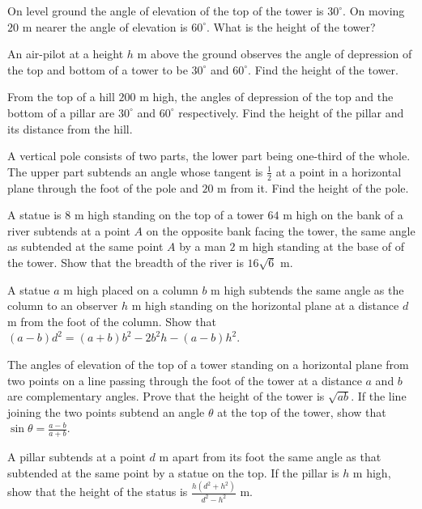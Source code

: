 \item On level ground the angle of elevation of the top of the tower is $30^\circ$. On moving $20$ m nearer the angle of
  elevation is $60^\circ$. What is the height of the tower?

\item An air-pilot at a height $h$ m above the ground observes the angle of depression of the top and bottom of a tower to be
  $30^\circ$ and $60^\circ$. Find the height of the tower.

\item From the top of a hill $200$ m high, the angles of depression of the top and the bottom of a pillar are $30^\circ$
  and $60^\circ$ respectively. Find the height of the pillar and its distance from the hill.

\item A vertical pole consists of two parts, the lower part being one-third of the whole. The upper part subtends an angle whose
  tangent is $\frac{1}{2}$ at a point in a horizontal plane through the foot of the pole and $20$ m from it. Find
  the height of the pole.

\item A statue is $8$ m high standing on the top of a tower $64$ m high on the bank of a river subtends at a point
  $A$ on the opposite bank facing the tower, the same angle as subtended at the same point $A$ by a man $2$ m
  high standing at the base of of the tower. Show that the breadth of the river is $16\sqrt{6}$ m.

\item A statue $a$ m high placed on a column $b$ m high subtends the same angle as the column to an observer $h$ m
  high standing on the horizontal plane at a distance $d$ m from the foot of the column. Show that $(a - b)d^2 =
  (a + b)b^2 - 2b^2h - (a - b)h^2$.

\item The angles of elevation of the top of a tower standing on a horizontal plane from two points on a line passing through the foot
  of the tower at a distance $a$ and $b$ are complementary angles. Prove that the height of the tower is
  $\sqrt{ab}$. If the line joining the two points subtend an angle $\theta$ at the top of the tower, show that
  $\sin\theta = \frac{a - b}{a + b}$.

\item A pillar subtends at a point $d$ m apart from its foot the same angle as that subtended at the same point by a statue on
  the top. If the pillar is $h$ m high, show that the height of the status is $\frac{h(d^2 + h^2)}{d^2 - h^2}$ m.

